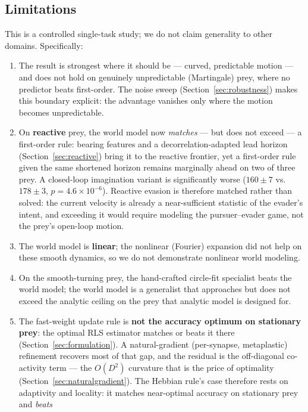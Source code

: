 \documentclass[11pt]{article}
\begin{document}
\subsection{Limitations}\label{sec:limitations}

This is a controlled single-task study; we do not claim generality to other domains.
Specifically:
\begin{enumerate}
\item The result is strongest where it should be --- curved, predictable motion --- and does
  not hold on genuinely unpredictable (Martingale) prey, where no predictor beats first-order.
  The noise sweep (Section~\ref{sec:robustness}) makes this boundary explicit: the advantage
  vanishes only where the motion becomes unpredictable.
\item On \textbf{reactive} prey, the world model now \emph{matches} --- but does not exceed --- a
  first-order rule: bearing features and a decorrelation-adapted lead horizon
  (Section~\ref{sec:reactive}) bring it to the reactive frontier, yet a first-order rule given the
  same shortened horizon remains marginally ahead on two of three prey. A closed-loop imagination
  variant is significantly worse ($160 \pm 7$ vs.\ $178 \pm 3$, $p = 4.6 \times 10^{-6}$). Reactive
  evasion is therefore matched rather than solved: the current velocity is already a near-sufficient
  statistic of the evader's intent, and exceeding it would require modeling the pursuer--evader game,
  not the prey's open-loop motion.
\item The world model is \textbf{linear}; the nonlinear (Fourier) expansion did not help on
  these smooth dynamics, so we do not demonstrate nonlinear world modeling.
\item On the smooth-turning prey, the hand-crafted circle-fit specialist beats the world model;
  the world model is a generalist that approaches but does not exceed the analytic ceiling on
  the prey that analytic model is designed for.
\item The fast-weight update rule is \textbf{not the accuracy optimum on stationary prey}: the
  optimal RLS estimator matches or beats it there (Section~\ref{sec:formulation}). A
  natural-gradient (per-synapse, metaplastic) refinement recovers most of that gap, and the
  residual is the off-diagonal co-activity term --- the $O(D^2)$ curvature that is the price of
  optimality (Section~\ref{sec:naturalgradient}). The Hebbian rule's case therefore rests on
  adaptivity and locality: it matches near-optimal accuracy on stationary prey and \emph{beats}

\end{enumerate}
\end{document}

